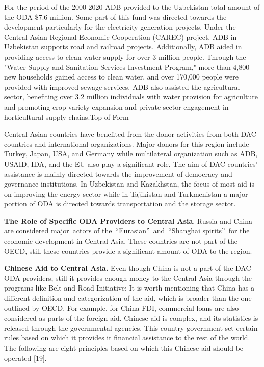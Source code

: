 For the period of the 2000-2020 ADB provided to the Uzbekistan total
amount of the ODA \$7.6 million. Some part of this fund was directed
towards the development particularly for the electricity generation
projects. Under the Central Asian Regional Economic Cooperation (CAREC)
project, ADB in Uzbekistan supports road and railroad projects.
Additionally, ADB aided in providing access to clean water supply for
over 3 million people. Through the "Water Supply and Sanitation Services
Investment Program," more than 4,800 new households gained access to
clean water, and over 170,000 people were provided with improved sewage
services. ADB also assisted the agricultural sector, benefiting over 3.2
million individuals with water provision for agriculture and promoting
crop variety expansion and private sector engagement in horticultural
supply chains.Top of Form

Central Asian countries have benefited from the donor activities from
both DAC countries and international organizations. Major donors for
this region include Turkey, Japan, USA, and Germany while multilateral
organization such as ADB, USAID, IDA, and the EU also play a significant
role. The aim of DAC countries' assistance is mainly directed towards
the improvement of democracy and governance institutions. In Uzbekistan
and Kazakhstan, the focus of most aid is on improving the energy sector
while in Tajikistan and Turkmenistan a major portion of ODA is directed
towards transportation and the storage sector.

{\bfseries The Role of Specific ODA Providers to Central Asia}. Russia and
China are considered major~actors of the~``Eurasian''~and~``Shanghai
spirits''~for the economic development in Central Asia. These countries
are not part of the OECD, still these countries provide a significant
amount of ODA to the region.

{\bfseries Chinese Aid to Central Asia.} Even though China is not a part of
the DAC ODA providers, still it provides enough money to the Central
Asia through the programs like Belt and Road Initiative; It is worth
mentioning that China has a different definition and categorization of
the aid, which is broader than the one outlined by OECD. For example,
for China FDI, commercial loans are also considered as parts of the
foreign aid. Chinese aid is complex, and its statistics is released
through the governmental agencies. This country government set certain
rules based on which it provides it financial assistance to the rest of
the world. The following are eight principles based on which this
Chinese aid should be operated {[}19{]}.

